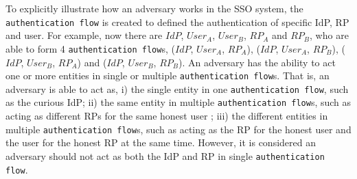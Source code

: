 To explicitly illustrate how an adversary works in the SSO system, the \verb+authentication flow+ is created to defined the authentication of specific IdP,  RP and user. For example, now there are $IdP$, $User_{A}$, $User_{B}$, $RP_{A}$ and $RP_{B}$, who are able to form 4 \verb+authentication flow+s, ($IdP$, $User_{A}$, $RP_{A}$), ($IdP$, $User_{A}$, $RP_{B}$), ($IdP$, $User_{B}$, $RP_{A}$) and ($IdP$, $User_{B}$, $RP_{B}$). An adversary has the ability to act one or more entities in single or multiple \verb+authentication flow+s. That is, an adversary is able to act as, i) the single entity in one \verb+authentication flow+, such as the curious IdP; ii) the same entity in multiple \verb+authentication flow+s, such as acting as different RPs for the same honest user ; iii) the different entities in multiple \verb+authentication flow+s, such as acting as the RP for the honest user and the user for the honest RP at the same time. However, it is considered an adversary should not act as both the IdP and RP in single \verb+authentication flow+.

